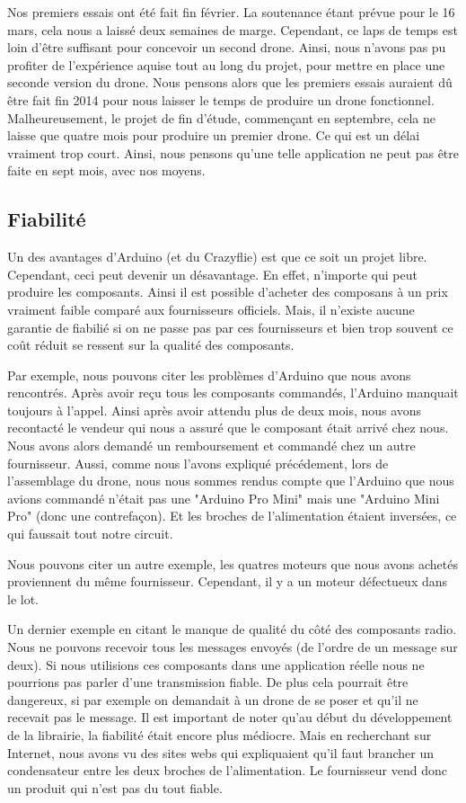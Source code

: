 \documentclass[a4paper,10pt]{report}
\begin{document}
	Nos premiers essais ont été fait fin février. La soutenance étant 
prévue pour le 16 mars, cela nous a laissé deux semaines de marge. Cependant, 
ce laps de temps est loin d'être suffisant pour concevoir un second drone. 
Ainsi, nous n'avons pas pu profiter de l'expérience aquise tout au long du 
projet, pour mettre en place une seconde version du drone. Nous pensons alors 
que les premiers essais auraient dû être fait fin 2014 pour nous laisser le 
temps de produire un drone fonctionnel. Malheureusement, le projet de fin 
d'étude, commençant en septembre, cela ne laisse que quatre mois pour produire 
un premier drone. Ce qui est un délai vraiment trop court. Ainsi, nous pensons 
qu'une telle application ne peut pas être faite en sept mois, avec nos moyens.
      
      \subsection{Fiabilité}
	Un des avantages d'Arduino (et du Crazyflie) est que ce soit un projet 
libre. Cependant, ceci peut devenir un désavantage. En effet, n'importe qui 
peut produire les composants. Ainsi il est possible d'acheter des composans à 
un prix vraiment faible comparé aux fournisseurs officiels. Mais, il n'existe 
aucune garantie de fiabilié si on ne passe pas par ces fournisseurs et bien 
trop souvent ce coût réduit se ressent sur la qualité des composants.
	
	Par exemple, nous pouvons citer les problèmes d'Arduino que nous avons 
rencontrés. Après avoir reçu tous les composants commandés, l'Arduino manquait 
toujours à l'appel. Ainsi après avoir attendu plus de deux mois, nous avons 
recontacté le vendeur qui nous a assuré que le composant était arrivé chez 
nous. Nous avons alors demandé un remboursement et commandé chez un autre 
fournisseur. Aussi, comme nous l'avons expliqué précédement, lors de 
l'assemblage du drone, nous nous sommes rendus compte que l'Arduino que nous 
avions commandé n'était pas une "Arduino Pro Mini" mais une "Arduino Mini Pro" 
(donc une contrefaçon). Et les broches de l'alimentation étaient inversées, ce 
qui faussait tout notre circuit.

      Nous pouvons citer un autre exemple, les quatres moteurs que nous avons 
achetés proviennent du même fournisseur. Cependant, il y a un moteur défectueux 
dans le lot.

      Un dernier exemple en citant le manque de qualité du côté des composants 
radio. Nous ne pouvons recevoir tous les messages envoyés (de l'ordre de un 
message sur deux). Si nous utilisions ces composants dans une application 
réelle nous ne pourrions pas parler d'une transmission fiable. De plus cela 
pourrait être dangereux, si par exemple on demandait à un drone de se poser et 
qu'il ne recevait pas le message. Il est important de noter qu'au début du 
développement de la librairie, la fiabilité était encore plus médiocre. Mais en 
recherchant sur Internet, nous avons vu des sites webs qui expliquaient qu'il 
faut brancher un condensateur entre les deux broches de l'alimentation. Le 
fournisseur vend donc un produit qui n'est pas du tout fiable.
\end{document}
